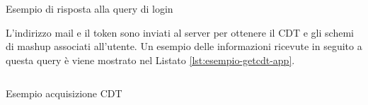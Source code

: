 \begin{listing}[H]
	\inputminted{json}{6-implementazione-app/Codice/esempio-login-app.json}
	\caption{Esempio di risposta alla query di login}
	\label{lst:esempio-login-app}
\end{listing}

L'indirizzo mail e il token sono inviati al server per ottenere il CDT e gli schemi di mashup associati all'utente. Un esempio delle informazioni ricevute in seguito a questa query è viene mostrato nel Listato \ref{lst:esempio-getcdt-app}.


\begin{listing}[H]
	\inputminted{json}{6-implementazione-app/Codice/get-cdt-app.json}
	\caption{Esempio acquisizione CDT}
	\label{lst:esempio-getcdt-app}
\end{listing}

